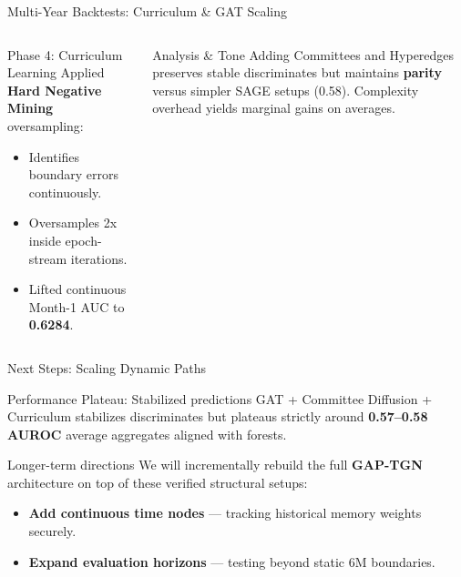 \documentclass[aspectratio=169,11pt]{beamer}
\begin{document}
\begin{frame}{Multi-Year Backtests: Curriculum \& GAT Scaling}

  \vspace{-1em}
  \begin{table}[H]
    \centering
    \tiny
    \setlength{\tabcolsep}{4pt}
    \renewcommand{\arraystretch}{1.0}
    
    \caption{\tiny Dynamic 5-Year aggregate summary.}
  \end{table}

  \begin{columns}[T]
      \begin{block}{Phase 4: Curriculum Learning}
        \footnotesize
        Applied \textbf{Hard Negative Mining} oversampling:
        \begin{itemize}
          \item Identifies boundary errors continuously.
          \item Oversamples 2x inside epoch-stream iterations.
          \item Lifted continuous Month-1 AUC to \textbf{0.6284}.
        \end{itemize}
      \end{block}

      \begin{alertblock}{Analysis \& Tone}
        \footnotesize
        Adding Committees and Hyperedges preserves stable discriminates but maintains \textbf{parity} versus simpler SAGE setups (0.58). Complexity overhead yields marginal gains on averages.
      \end{alertblock}
  \end{columns}

\end{frame}

\begin{frame}{Next Steps: Scaling Dynamic Paths}

  \begin{block}{Performance Plateau: Stabilized predictions}
    \small
    GAT + Committee Diffusion + Curriculum stabilizes discriminates but plateaus strictly around \textbf{0.57--0.58 AUROC} average aggregates aligned with forests.
  \end{block}

  \medskip
  \begin{exampleblock}{Longer-term directions}
    \small
    We will incrementally rebuild the full \textbf{GAP-TGN} architecture on top of these verified structural setups:
    \begin{itemize}
      \item \textbf{Add continuous time nodes} --- tracking historical memory weights securely.
      \item \textbf{Expand evaluation horizons} --- testing beyond static 6M boundaries.
    \end{itemize}
  \end{exampleblock}

\end{frame}
\end{document}
